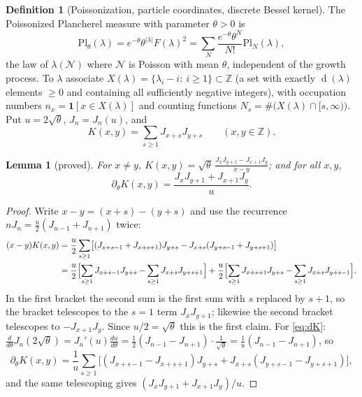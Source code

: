 \documentclass[11pt]{article}
\newtheorem{lemma}[theorem]{Lemma}
\theoremstyle{definition}
\newtheorem{definition}[theorem]{Definition}
\theoremstyle{remark}
\newcommand{\Z}{\mathbb{Z}}
\newcommand{\Pl}{\mathrm{Pl}}
\DeclareMathOperator{\Durfee}{d}
\begin{document}
\begin{definition}[Poissonization, particle coordinates, discrete Bessel kernel]\label{def:bessel}
The Poissonized Plancherel measure with parameter $\theta>0$ is
\[
\Pl_\theta(\lambda)=e^{-\theta}\theta^{|\lambda|}F(\lambda)^2=\sum_N\frac{e^{-\theta}\theta^N}{N!}\Pl_N(\lambda),
\]
the law of $\lambda(\mathcal N)$ where $\mathcal N$ is Poisson with mean $\theta$, independent of the growth process. To $\lambda$ associate $X(\lambda)=\{\lambda_i-i:\ i\ge1\}\subset\Z$ (a set with exactly $\Durfee(\lambda)$ elements $\ge0$ and containing all sufficiently negative integers), with occupation numbers $n_x=\mathbf 1[x\in X(\lambda)]$ and counting functions $N_s=\#\bigl(X(\lambda)\cap[s,\infty)\bigr)$. Put $u=2\sqrt\theta$, $J_n=J_n(u)$, and
\begin{equation}\label{eq:Kdef}
K(x,y)=\sum_{s\ge1}J_{x+s}J_{y+s}\qquad(x,y\in\Z).
\end{equation}
\end{definition}

\begin{lemma}[proved]\label{lem:Kforms}
For $x\ne y$, $\displaystyle K(x,y)=\sqrt\theta\,\frac{J_xJ_{y+1}-J_{x+1}J_y}{x-y}$; and for all $x,y$,
\begin{equation}\label{eq:dK}
\partial_\theta K(x,y)=\frac{J_xJ_{y+1}+J_{x+1}J_y}{u}.
\end{equation}
\end{lemma}

\begin{proof}
Write $x-y=(x+s)-(y+s)$ and use the recurrence $nJ_n=\frac u2(J_{n-1}+J_{n+1})$ twice:
\begin{align*}
(x-y)K(x,y)&=\frac u2\sum_{s\ge1}\bigl[(J_{x+s-1}+J_{x+s+1})J_{y+s}-J_{x+s}(J_{y+s-1}+J_{y+s+1})\bigr]\\
&=\frac u2\Bigl[\sum_{s\ge1}J_{x+s-1}J_{y+s}-\sum_{s\ge1}J_{x+s}J_{y+s+1}\Bigr]+\frac u2\Bigl[\sum_{s\ge1}J_{x+s+1}J_{y+s}-\sum_{s\ge1}J_{x+s}J_{y+s-1}\Bigr].
\end{align*}
In the first bracket the second sum is the first sum with $s$ replaced by $s+1$, so the bracket telescopes to the $s=1$ term $J_xJ_{y+1}$; likewise the second bracket telescopes to $-J_{x+1}J_y$. Since $u/2=\sqrt\theta$ this is the first claim. For \eqref{eq:dK}: $\frac{d}{d\theta}J_n(2\sqrt\theta)=J_n'(u)\frac{du}{d\theta}=\frac12(J_{n-1}-J_{n+1})\cdot\frac{1}{\sqrt\theta}=\frac1u(J_{n-1}-J_{n+1})$, so
\[
\partial_\theta K(x,y)=\frac1u\sum_{s\ge1}\bigl[(J_{x+s-1}-J_{x+s+1})J_{y+s}+J_{x+s}(J_{y+s-1}-J_{y+s+1})\bigr],
\]
and the same telescoping gives $(J_xJ_{y+1}+J_{x+1}J_y)/u$.
\end{proof}
\end{document}
